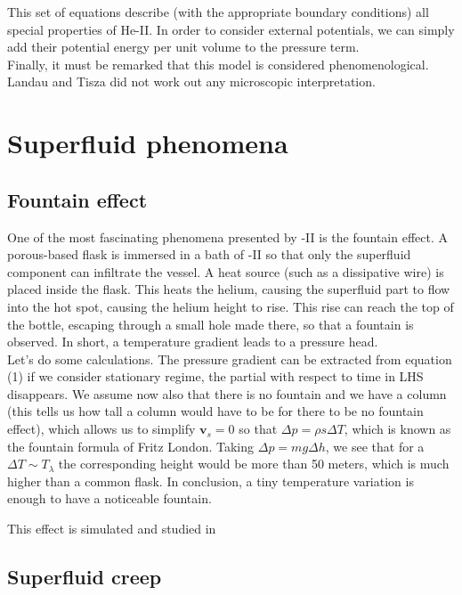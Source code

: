 \documentclass{article}
\begin{document}
This set of equations describe (with the appropriate boundary conditions) all special properties of He-II\@. In order to consider external potentials, we can simply add their potential energy per unit volume to the pressure term. 
\\

Finally, it must be remarked that this model is considered phenomenological. Landau and Tisza did not work out any microscopic interpretation. 

\section{Superfluid phenomena}

\subsection{Fountain effect}


One of the most fascinating phenomena presented by -II is the fountain effect. A porous-based flask is immersed in a bath of -II so that only the superfluid component can infiltrate the vessel. A heat source (such as a dissipative wire) is placed inside the flask. This heats the helium, causing the superfluid part to flow into the hot spot, causing the helium height to rise. This rise can reach the top of the bottle, escaping through a small hole made there, so that a fountain is observed. In short, a temperature gradient leads to a pressure head.
\\

Let's do some calculations. The pressure gradient can be extracted from equation (1) if we consider stationary regime, the partial with respect to time in LHS disappears. We assume now also that there is no fountain and we have a column (this tells us how tall a column would have to be for there to be no fountain effect), which allows us to simplify $\mathbf{v}_s = 0$ so that $\Delta p = \rho s \Delta T$, which is known as the fountain formula of Fritz London. Taking $\Delta p = mg \Delta h$, we see that for a $\Delta T \sim T_\lambda$ the corresponding height would be more than 50 meters, which is much higher than a common flask. In conclusion, a tiny temperature variation is enough to have a noticeable fountain.

This effect is simulated and studied in \cite{Kincl}

\subsection{Superfluid creep}
\end{document}
